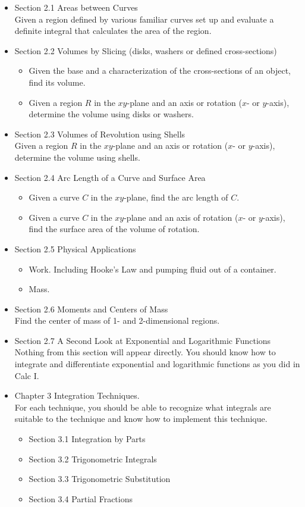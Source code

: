 \documentclass[11pt,fleqn]{article}
\begin{document}
\begin{itemize}
\item Section 2.1 Areas between Curves\\
Given a region defined by various familiar curves set up and evaluate a definite integral that calculates the area of the region.
\item Section 2.2 Volumes by Slicing (disks, washers or defined cross-sections)
	\begin{itemize}
	\item Given the base and a characterization of the cross-sections of an object, find its volume.
	\item Given a region $R$ in the $xy$-plane and an axis or rotation ($x$- or $y$-axis), determine the volume using disks or washers.
	\end{itemize}
\item Section 2.3 Volumes of Revolution using Shells\\
Given a region $R$ in the $xy$-plane and an axis or rotation ($x$- or $y$-axis), determine the volume using shells.
\item Section 2.4 Arc Length of a Curve and Surface Area
	\begin{itemize}
	\item Given a curve $C$ in the $xy$-plane, find the arc length of $C$. 
	\item Given a curve $C$ in the $xy$-plane and an axis of rotation ($x$- or $y$-axis), find the surface area of the volume of rotation.
	\end{itemize}
\item Section 2.5 Physical Applications
	\begin{itemize}
	\item Work. Including Hooke's Law and pumping fluid out of a container.
	\item Mass.
	\end{itemize}
\item Section 2.6 Moments and Centers of Mass\\
Find the center of mass of 1- and 2-dimensional regions.
\item Section 2.7 A Second Look at Exponential and Logarithmic Functions\\
Nothing from this section will appear directly. You should know how to integrate and differentiate exponential and logarithmic functions as you did in Calc I.



\item Chapter 3 Integration Techniques.\\
For each technique, you should be able to recognize what integrals are suitable to the technique and know how to implement this technique.
	\begin{itemize}
	\item Section 3.1 Integration by Parts
	\item Section 3.2 Trigonometric Integrals
	\item Section 3.3 Trigonometric Substitution
	\item Section 3.4 Partial Fractions
	\end{itemize}
\end{itemize}
\end{document}
